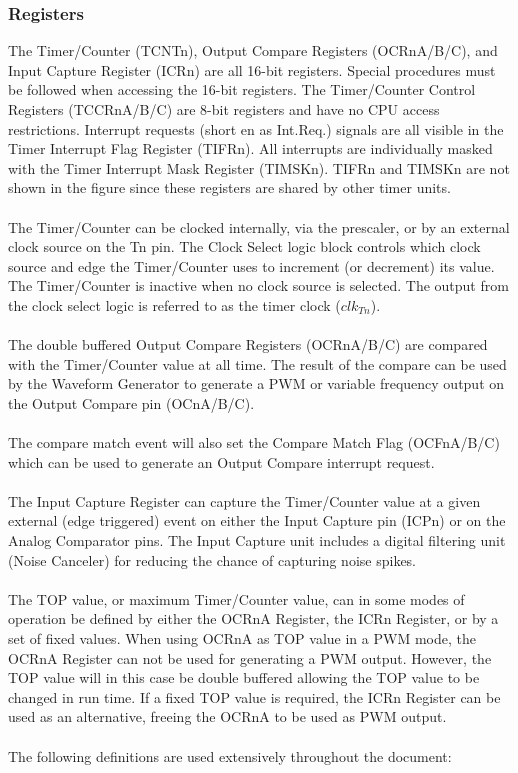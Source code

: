 \documentclass[english]{article}
\begin{document}
\subsubsection{Registers}
The Timer/Counter (TCNTn), Output Compare Registers (OCRnA/B/C), and Input Capture Register (ICRn) are all 16-bit registers. Special procedures must be followed when accessing the 16-bit registers. The Timer/Counter Control Registers (TCCRnA/B/C) are 8-bit registers and have no CPU access restrictions. Interrupt requests (short en as Int.Req.) signals are all visible in the Timer Interrupt Flag Register (TIFRn). All interrupts are individually masked with the Timer Interrupt Mask Register (TIMSKn). TIFRn and TIMSKn are not shown in the figure since these registers are shared by other timer units.\\\\
The Timer/Counter can be clocked internally, via the prescaler, or by an external clock source on
the Tn pin. The Clock Select logic block controls which clock source and edge the Timer/Counter
uses to increment (or decrement) its value. The Timer/Counter is inactive when no clock source
is selected. The output from the clock select logic is referred to as the timer clock ($clk_{Tn}$).\\\\
The double buffered Output Compare Registers (OCRnA/B/C) are compared with the
Timer/Counter value at all time. The result of the compare can be used by the Waveform Generator to generate a PWM or variable frequency output on the Output Compare pin (OCnA/B/C).\\\\
The compare match event will also set the Compare Match Flag (OCFnA/B/C) which can be used to generate an Output Compare interrupt request.\\\\
The Input Capture Register can capture the Timer/Counter value at a given external (edge triggered) event on either the Input Capture pin (ICPn) or on the Analog Comparator pins. The Input Capture unit includes a digital filtering unit (Noise Canceler) for reducing the chance of capturing noise spikes.\\\\
The TOP value, or maximum Timer/Counter value, can in some modes of operation be defined
by either the OCRnA Register, the ICRn Register, or by a set of fixed values. When using OCRnA as TOP value in a PWM mode, the OCRnA Register can not be used for generating a PWM output. However, the TOP value will in this case be double buffered allowing the TOP value to be changed in run time. If a fixed TOP value is required, the ICRn Register can be used as an alternative, freeing the OCRnA to be used as PWM output.\\\\
The following definitions are used extensively throughout the document:\\\\
\end{document}
